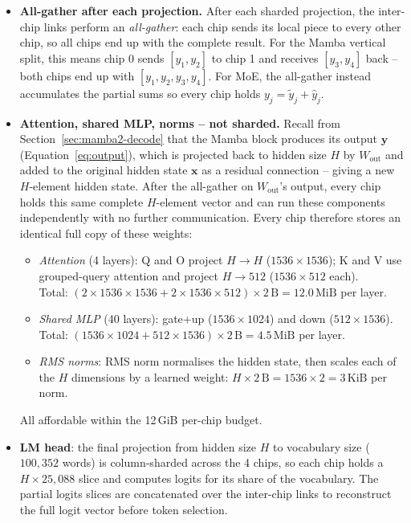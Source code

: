 \begin{itemize}
  Concatenation is cheaper than an element-wise sum across chips, so the vertical split is preferred. The same column split is applied to $W_{\mathrm{out}}$.
\item \textbf{All-gather after each projection.} After each sharded projection, the inter-chip links perform an \emph{all-gather}: each chip sends its local piece to every other chip, so all chips end up with the complete result. For the Mamba vertical split, this means chip 0 sends $[y_1,y_2]$ to chip 1 and receives $[y_3,y_4]$ back -- both chips end up with $[y_1,y_2,y_3,y_4]$. For MoE, the all-gather instead accumulates the partial sums so every chip holds $y_j = \tilde{y}_j + \hat{y}_j$.

\item \textbf{Attention, shared MLP, norms -- not sharded.} Recall from Section~\ref{sec:mamba2-decode} that the Mamba block produces its output $\mathbf{y}$ (Equation~\ref{eq:output}), which is projected back to hidden size $H$ by $W_{\mathrm{out}}$ and added to the original hidden state $\mathbf{x}$ as a residual connection -- giving a new $H$-element hidden state. After the all-gather on $W_{\mathrm{out}}$'s output, every chip holds this same complete $H$-element vector and can run these components independently with no further communication. Every chip therefore stores an identical full copy of these weights:
  \begin{itemize}
    \item \emph{Attention} (4 layers): Q and O project $H{\to}H$ ($1536{\times}1536$); K and V use grouped-query attention and project $H{\to}512$ ($1536{\times}512$ each).\\
      Total: $(2{\times}1536{\times}1536 + 2{\times}1536{\times}512){\times}2\,\text{B} = 12.0\,\text{MiB}$ per layer.
    \item \emph{Shared MLP} (40 layers): gate+up ($1536{\times}1024$) and down ($512{\times}1536$). Total: $(1536{\times}1024 + 512{\times}1536){\times}2\,\text{B} = 4.5\,\text{MiB}$ per layer.
    \item \emph{RMS norms}: RMS norm normalises the hidden state, then scales each of the $H$ dimensions by a learned weight: $H{\times}2\,\text{B} = 1536{\times}2 = 3\,\text{KiB}$ per norm.
  \end{itemize}
  All affordable within the 12\,GiB per-chip budget.
\item \textbf{LM head}: the final projection from hidden size $H$ to vocabulary size ($100{,}352$ words) is column-sharded across the 4 chips, so each chip holds a $H{\times}25{,}088$ slice and computes logits for its share of the vocabulary. The partial logits slices are concatenated over the inter-chip links to reconstruct the full logit vector before token selection.
\end{itemize}


